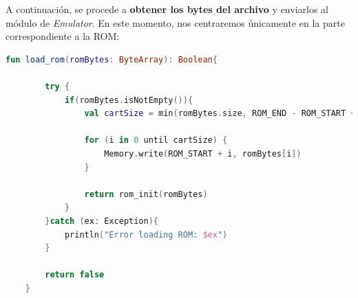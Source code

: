 A continuación, se procede a \textbf{obtener los bytes del archivo} y enviarlos al módulo de \textit{Emulator}. En este momento, nos centraremos únicamente en la parte correspondiente a la ROM:

\begin{lstlisting}[language=Kotlin, caption={Función principal de carga de ROM y manejo de errores durante el proceso.}, label={code:kotlinloadrom}]
    fun load_rom(romBytes: ByteArray): Boolean{

        try {
            if(romBytes.isNotEmpty()){
                val cartSize = min(romBytes.size, ROM_END - ROM_START + 1)

                for (i in 0 until cartSize) {
                    Memory.write(ROM_START + i, romBytes[i])
                }

                return rom_init(romBytes)
            }
        }catch (ex: Exception){
            println("Error loading ROM: $ex")
        }

        return false
    }
\end{lstlisting}

